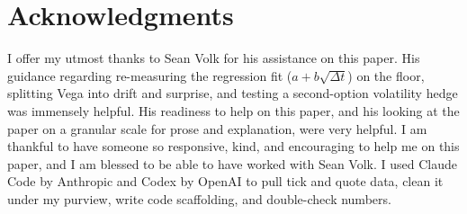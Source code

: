 \documentclass[11pt]{article}
\begin{document}
\section*{Acknowledgments}
I offer my utmost thanks to Sean Volk for his assistance on this paper. His guidance regarding re-measuring the regression fit ($a + b\sqrt{\Delta t}$) on the floor, splitting Vega into drift and surprise, and testing a second-option volatility hedge was immensely helpful. His readiness to help on this paper, and his looking at the paper on a granular scale for prose and explanation, were very helpful. I am thankful to have someone so responsive, kind, and encouraging to help 
me on this paper, and I am blessed to be able to have worked with Sean Volk. I used Claude Code by Anthropic and Codex by OpenAI to pull tick and quote data, clean it under my purview, write code scaffolding, and double-check numbers. 

\appendix
\end{document}
